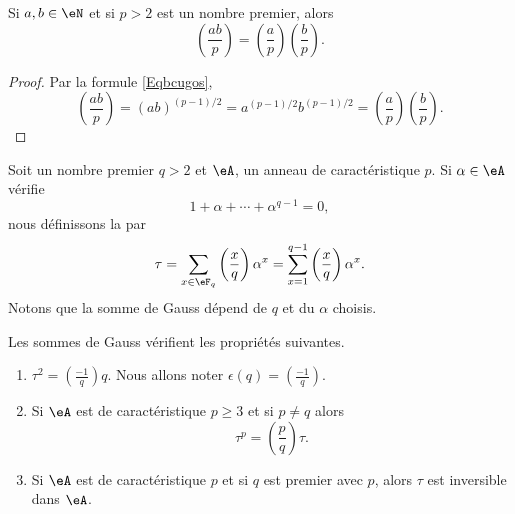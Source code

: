 \begin{corollary}   \label{CoruJosNz}
	Si \( a,b\in \eN\) et si \( p>2\) est un nombre premier, alors
	\begin{equation}
		\left(\frac{ab}{p}\right)=\left(\frac{a}{p}\right)\left(\frac{b}{p}\right).
	\end{equation}
\end{corollary}

\begin{proof}
	Par la formule \eqref{Eqbcugos},
	\begin{equation}
		\left(\frac{ab}{p}\right)=(ab)^{(p-1)/2}=a^{(p-1)/2}b^{(p-1)/2}=\left(\frac{a}{p}\right)\left(\frac{b}{p}\right).
	\end{equation}
\end{proof}

Soit un nombre premier \( q>2\) et \( \eA\), un anneau de caractéristique \( p\). Si \( \alpha\in \eA\) vérifie
\begin{equation}
	1+\alpha+\cdots+\alpha^{q-1}=0,
\end{equation}
nous définissons la  par
\begin{equation}
	\tau=\sum_{x\in \eF_q}\left(\frac{x}{q}\right)\alpha^x=\sum_{x=1}^{q-1}\left(\frac{x}{q}\right)\alpha^x.
\end{equation}
Notons que la somme de Gauss dépend de \( q\) et du \( \alpha\) choisis.

\begin{proposition} \label{PropciRUov}
	Les sommes de Gauss vérifient les propriétés suivantes.
	\begin{enumerate}
		\item
		      \( \tau^2=\left(\frac{-1}{q}\right)q\). Nous allons noter \( \epsilon(q)=\left(\frac{-1}{q}\right)\).
		\item
		      Si \( \eA\) est de caractéristique \( p\geq 3\) et si \( p\neq q\) alors
		      \begin{equation}    \label{EqxBNpJz}
			      \tau^p=\left(\frac{p}{q}\right)\tau.
		      \end{equation}
		\item
		      Si \( \eA\) est de caractéristique \( p\) et si \( q\) est premier avec \( p\), alors \( \tau\) est inversible dans \( \eA\).
	\end{enumerate}
\end{proposition}

